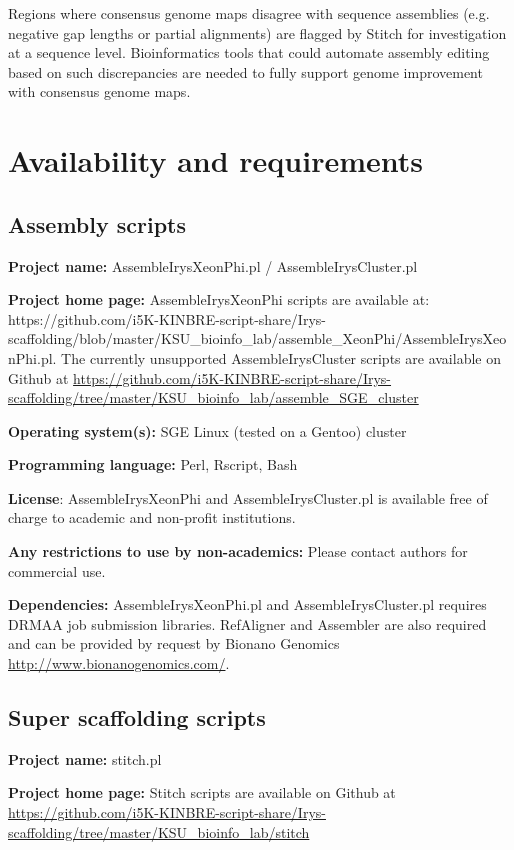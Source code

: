 \documentclass{bmcart}
\begin{document}
Regions where consensus genome maps disagree with sequence assemblies (e.g. negative gap lengths or partial alignments) are flagged by Stitch for investigation at a sequence level. Bioinformatics tools that could automate assembly editing based on such discrepancies are needed to fully support genome improvement with consensus genome maps. 

\section*{Availability and requirements}

\subsection*{\textbf{Assembly scripts}}

\textbf{Project name:} AssembleIrysXeonPhi.pl / AssembleIrysCluster.pl

\textbf{Project home page:} AssembleIrysXeonPhi scripts are available at: https://github.com/i5K-KINBRE-script-share/Irys-scaffolding/blob/master/KSU\_bioinfo\_lab/assemble\_XeonPhi/AssembleIrysXeonPhi.pl. The currently unsupported AssembleIrysCluster scripts are available on Github at \url{https://github.com/i5K-KINBRE-script-share/Irys-scaffolding/tree/master/KSU\_bioinfo\_lab/assemble\_SGE\_cluster}

\textbf{Operating system(s):} SGE Linux (tested on a Gentoo) cluster

\textbf{Programming language:} Perl, Rscript, Bash

\textbf{License}: AssembleIrysXeonPhi and AssembleIrysCluster.pl is available free of charge to academic and non-profit institutions.

\textbf{Any restrictions to use by non-academics:} Please contact authors for commercial use.

\textbf{Dependencies:} AssembleIrysXeonPhi.pl and AssembleIrysCluster.pl requires DRMAA job submission libraries. RefAligner and Assembler are also required and can be provided by request by Bionano Genomics \url{http://www.bionanogenomics.com/}.

\subsection*{\textbf{Super scaffolding scripts}}

\textbf{Project name:} stitch.pl

\textbf{Project home page:} Stitch scripts are available on Github at \url{https://github.com/i5K-KINBRE-script-share/Irys-scaffolding/tree/master/KSU\_bioinfo\_lab/stitch}
\end{document}
